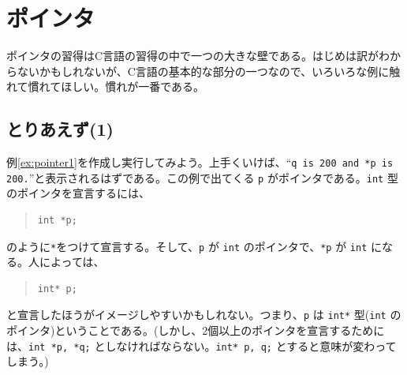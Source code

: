 \section{ポインタ}

ポインタの習得はC言語の習得の中で一つの大きな壁である。はじめは訳がわからないかもしれないが、C言語の基本的な部分の一つなので、いろいろな例に触れて慣れてほしい。慣れが一番である。

\subsection{とりあえず(1)}

例\ref{ex:pointer1}を作成し実行してみよう。上手くいけば、``{\tt q is 200 and *p is 200.}''と表示されるはずである。この例で出てくる \verb|p| がポインタである。\verb|int| 型のポインタを宣言するには、
\begin{quote}
\begin{verbatim}
int *p;
\end{verbatim}
\end{quote}
のように\verb|*|をつけて宣言する。そして、\verb|p| が \verb|int| のポインタで、\verb|*p| が \verb|int| になる。人によっては、
\begin{quote}
\begin{verbatim}
int* p;
\end{verbatim}
\end{quote}
と宣言したほうがイメージしやすいかもしれない。つまり、\verb|p| は \verb|int*| 型(\verb|int| のポインタ)ということである。(しかし、2個以上のポインタを宣言するためには、\verb|int *p, *q;| としなければならない。\verb|int* p, q;| とすると意味が変わってしまう。)

